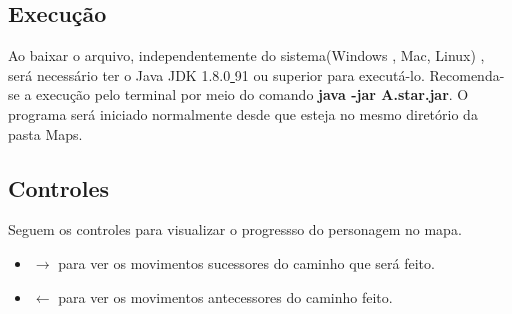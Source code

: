 \documentclass[hidelinks,12pt]{article}
\begin{document}
	\subsection{Execução}
		Ao baixar o arquivo, independentemente do sistema(Windows , Mac, Linux) , será necessário ter o Java JDK 1.8.0\underline{ }91  ou superior para executá-lo. Recomenda-se a execução pelo terminal por meio do comando \textbf{java -jar A.star.jar}. O programa será iniciado normalmente desde que esteja no mesmo diretório da pasta Maps.
	
	\subsection{Controles}
		Seguem os controles para visualizar o progressso do personagem no mapa.
		\begin{itemize}
			\item $\longrightarrow$ para ver os movimentos sucessores do caminho que será feito.
			\item $\longleftarrow$ para ver os movimentos antecessores do caminho feito.
		\end{itemize}
		
		
	
	
		
		
	
	
\end{document}
